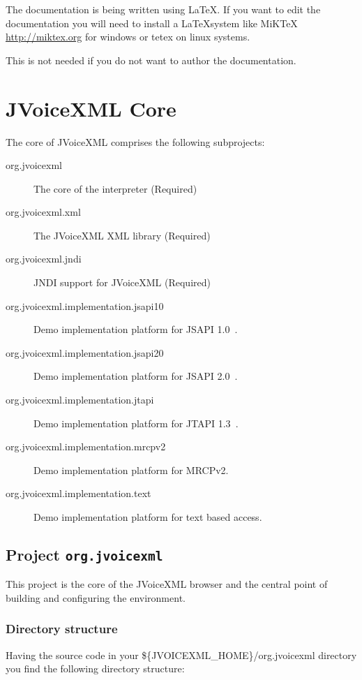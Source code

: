 \documentclass[11pt,a4paper]{article}
\begin{document}
The documentation is being written using \LaTeX. If you want to edit the
documentation you will need to install a \LaTeX system like MiKTeX
\url{http://miktex.org} for windows or tetex on linux systems.

This is not needed if you do not want to author the documentation.

\section{JVoiceXML Core}

The core of JVoiceXML comprises the following subprojects:

\begin{description}
\item[org.jvoicexml] The core of the interpreter (Required)
\item[org.jvoicexml.xml] The JVoiceXML XML library (Required)
\item[org.jvoicexml.jndi] JNDI support for JVoiceXML (Required)
\item[]\item[org.jvoicexml.implementation.jsapi10] Demo implementation platform for
JSAPI 1.0~\cite{sun:jsapi}.
\item[org.jvoicexml.implementation.jsapi20] Demo implementation platform for
JSAPI 2.0~\cite{jcp:jsr113}.
\item[org.jvoicexml.implementation.jtapi] Demo implementation platform for
JTAPI 1.3~\cite{sun:jtapi}.
\item[org.jvoicexml.implementation.mrcpv2] Demo implementation platform for
MRCPv2.
\item[org.jvoicexml.implementation.text] Demo implementation platform for
text based access.
\end{description}

\subsection{Project \lstinline{org.jvoicexml}}

This project is the core of the JVoiceXML browser and the central point of
building and configuring the environment.

\subsubsection{Directory structure}
\label{sec:directory-structure}

Having the source code in your \$\{JVOICEXML\_HOME\}/org.jvoicexml
directory you find the following directory structure:
\end{document}
